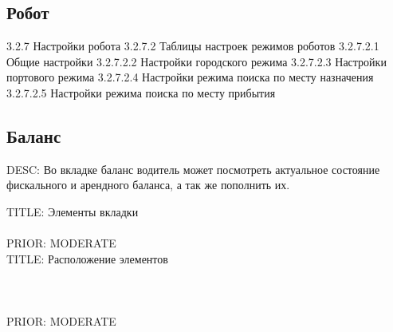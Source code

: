   \subsection{Робот}



    3.2.7 Настройки робота
    3.2.7.2 Таблицы настроек режимов роботов
    3.2.7.2.1 Общие настройки
    3.2.7.2.2 Настройки городского режима
    3.2.7.2.3 Настройки портового режима
    3.2.7.2.4 Настройки режима поиска по месту назначения
    3.2.7.2.5 Настройки режима поиска по месту прибытия

  \subsection{Баланс}

    DESC: Во вкладке баланс водитель может посмотреть актуальное состояние фискального и арендного баланса, а так же пополнить их. 

      TITLE: Элементы вкладки\\
      \\
      PRIOR: MODERATE\\

      TITLE: Расположение элементов\\
      \\
      \\
      \\
      PRIOR: MODERATE\\

